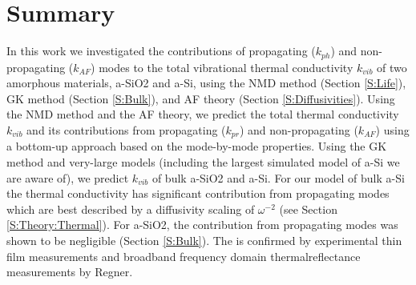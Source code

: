 \documentclass[aps,prb,onecolumn,preprint,superscriptaddress,footinbib,amsmath,amssymb,floatfix]{revtex4}
\begin{document}
% 
% 
% 

\section{\label{S:Lifetimes}Summary}

In this work we investigated the contributions of propagating ($k_{ph}$) 
and non-propagating ($k_{AF}$) modes to the total vibrational 
thermal conductivity $k_{vib}$ of two amorphous materials, 
a-SiO2 and a-Si, using the NMD method (Section \ref{S:Life}), 
GK method (Section \ref{S:Bulk}), 
and AF theory (Section \ref{S:Diffusivities}). 
Using the NMD method and the AF theory, 
we predict the total thermal conductivity $k_{vib}$ and its 
contributions from propagating ($k_{pr}$) and non-propagating 
($k_{AF}$) using a bottom-up approach 
based on the mode-by-mode properties. Using the GK method and very-large 
models (including the largest simulated model of a-Si we are aware of), 
we predict $k_{vib}$ of bulk a-SiO2 and a-Si. For our model of bulk a-Si 
the thermal conductivity has  
significant contribution from propagating modes which are best described 
by a diffusivity scaling of $\omega^{-2}$ 
(see Section \ref{S:Theory:Thermal}).  
For a-SiO2, the contribution from propagating modes was shown to 
be negligible (Section \ref{S:Bulk}). 
The is confirmed by experimental thin film measurements
\cite{love_estimate_1990,baldi_thermal_2008} 
and broadband frequency domain thermalreflectance measurements  
by Regner.\cite{regner_broadband_2013} 
\end{document}
